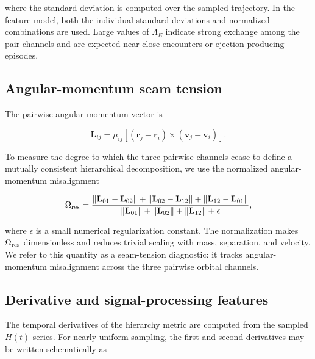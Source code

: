 \documentclass[12pt,a4paper]{article}
\newcommand{\Ores}{\Omega_{\rm res}}
\begin{document}
where the standard deviation is computed over the sampled trajectory. In the feature model, both the individual standard deviations and normalized combinations are used. Large values of \(\Lambda_E\) indicate strong exchange among the pair channels and are expected near close encounters or ejection-producing episodes.

\subsection{Angular-momentum seam tension}
\label{sec:omega_res}

The pairwise angular-momentum vector is

\begin{equation}
    \mathbf L_{ij}
    =
    \mu_{ij}
    \left[
    (\mathbf r_j-\mathbf r_i)
    \times
    (\mathbf v_j-\mathbf v_i)
    \right].
    \label{eq:pair_L}
\end{equation}

To measure the degree to which the three pairwise channels cease to define a mutually consistent hierarchical decomposition, we use the normalized angular-momentum misalignment

\begin{equation}
    \Ores =
    \frac{
    \|\mathbf L_{01}-\mathbf L_{02}\|
    +
    \|\mathbf L_{02}-\mathbf L_{12}\|
    +
    \|\mathbf L_{12}-\mathbf L_{01}\|
    }
    {
    \|\mathbf L_{01}\|+\|\mathbf L_{02}\|+\|\mathbf L_{12}\|+\epsilon
    },
    \label{eq:omega_res}
\end{equation}

where \(\epsilon\) is a small numerical regularization constant. The normalization makes \(\Ores\) dimensionless and reduces trivial scaling with mass, separation, and velocity. We refer to this quantity as a seam-tension diagnostic: it tracks angular-momentum misalignment across the three pairwise orbital channels.

\subsection{Derivative and signal-processing features}
\label{sec:derivative_signal_features}

The temporal derivatives of the hierarchy metric are computed from the sampled \(H(t)\) series. For nearly uniform sampling, the first and second derivatives may be written schematically as
\end{document}
